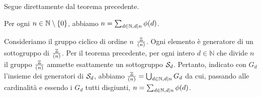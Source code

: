 \Proof
Segue direttamente dal teorema precedente.
\EndProof
\begin{Corollary}
	Per ogni $n \in \mathbb{N} \setminus \lbrace 0 \rbrace$, abbiamo
	$n = \sum_{d \in \mathbb{N},\\d|n} \phi(d)$.
\end{Corollary}
\Proof
Consideriamo il gruppo ciclico di ordine $n$
$\frac{\mathbb{Z}}{\left ( n \right )}$.
Ogni elemento \`e generatore di un sottogruppo
di
$\frac{\mathbb{Z}}{\left ( n \right )}$.
Per il teorema precedente, per ogni intero $d \in \mathbb{N}$
che divide $n$ il gruppo $\frac{\mathbb{Z}}{\left ( n \right )}$
ammette esattamente un sottogruppo $\mathcal{S}_d$.
Pertanto, indicato con $G_d$ l'insieme dei generatori di
$\mathcal{S}_d$, abbiamo
$\frac{\mathbb{Z}}{\left ( n \right )} =
\bigcup_{d \in \mathbb{N},\\d|n} G_d$
da cui, passando alle cardinalit\`a e essendo i $G_d$ tutti
disgiunti,
$n = \sum_{d \in \mathbb{N},\\d|n} \phi(d)$.
\EndProof
